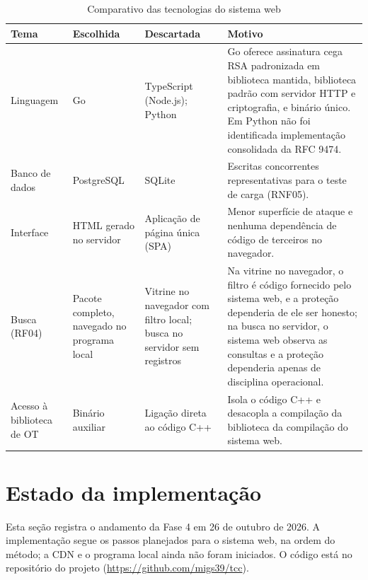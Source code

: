 \documentclass[12pt, oneside, a4paper, english, brazil]{abntex2}
\begin{document}
\begin{table}[H]
\centering
\caption{Comparativo das tecnologias do sistema web}\label{tab:comp-stack}
\footnotesize
\renewcommand{\arraystretch}{1.25}
\begin{tabularx}{\textwidth}{@{}>{\raggedright\arraybackslash}p{}
  >{\raggedright\arraybackslash}p{} >{\raggedright\arraybackslash}p{}
  >{\raggedright\arraybackslash}X@{}}
\toprule
\textbf{Tema} & \textbf{Escolhida} & \textbf{Descartada} & \textbf{Motivo} \\
\midrule
Linguagem & Go & TypeScript (Node.js); Python &
Go oferece assinatura cega RSA padronizada \cite{rfc9474} em biblioteca
mantida, biblioteca padrão com servidor HTTP e criptografia, e binário único.
Em Python não foi identificada implementação consolidada da RFC 9474. \\
\addlinespace
Banco de dados & PostgreSQL & SQLite &
Escritas concorrentes representativas para o teste de carga (RNF05). \\
\addlinespace
Interface & HTML gerado no servidor & Aplicação de página única (SPA) &
Menor superfície de ataque e nenhuma dependência de código de terceiros no
navegador. \\
\addlinespace
Busca (RF04) & Pacote completo, navegado no programa local & Vitrine no
navegador com filtro local; busca no servidor sem registros &
Na vitrine no navegador, o filtro é código fornecido pelo sistema web, e a
proteção dependeria de ele ser honesto; na busca no servidor, o sistema web
observa as consultas e a proteção dependeria apenas de disciplina
operacional. \\
\addlinespace
Acesso à biblioteca de OT & Binário auxiliar & Ligação direta ao código C++ &
Isola o código C++ e desacopla a compilação da biblioteca da compilação do
sistema web. \\
\bottomrule
\end{tabularx}
\end{table}

\section{Estado da implementação}\label{sec:estado}

Esta seção registra o andamento da Fase 4 em 26 de outubro de 2026. A
implementação segue os passos planejados para o sistema web, na ordem do
método; a CDN e o programa local ainda não foram iniciados. O código está no
repositório do projeto (\url{https://github.com/migs39/tcc}).
\end{document}
